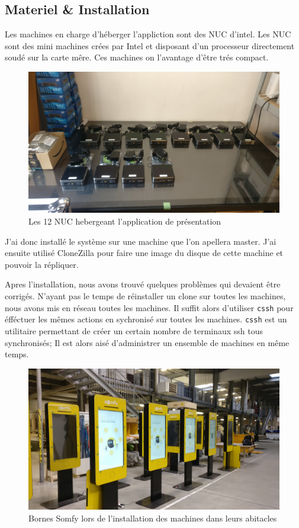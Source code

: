 
\subsection{Materiel \& Installation}

Les machines en charge d'héberger l'appliction sont des NUC d'intel.
Les NUC sont des mini machines crées par Intel et disposant d'un processeur directement soudé sur la carte mêre.
Ces machines on l'avantage d'être trés compact.

\begin{figure}[h]
    \centering
    \includegraphics[scale=0.1]{img/somfy-nuc.jpg}
    \caption{Les 12 NUC hebergeant l'application de présentation}
\end{figure}

J'ai donc installé le système sur une machine que l'on apellera master.
J'ai ensuite utilisé CloneZilla pour faire une image du disque de cette machine et pouvoir la répliquer.

Apres l'installation, nous avons trouvé quelques problèmes qui devaient être corrigés.
N'ayant pas le temps de réinstaller un clone sur toutes les machines, nous avons mis en réseau toutes les machines.
Il suffit alors d'utiliser \texttt{cssh} pour éfféctuer les mêmes actions en sychronisé sur toutes les machines.
\texttt{cssh} est un utilitaire permettant de créer un certain nombre de terminaux ssh tous synchronisés;
Il est alors aisé d'administrer un ensemble de machines en même temps.

\begin{figure}[h]
    \centering
    \includegraphics[scale=0.1]{img/somfy-install.jpg}
    \caption{Bornes Somfy lors de l'installation des machines dans leurs abitacles}
\end{figure}

